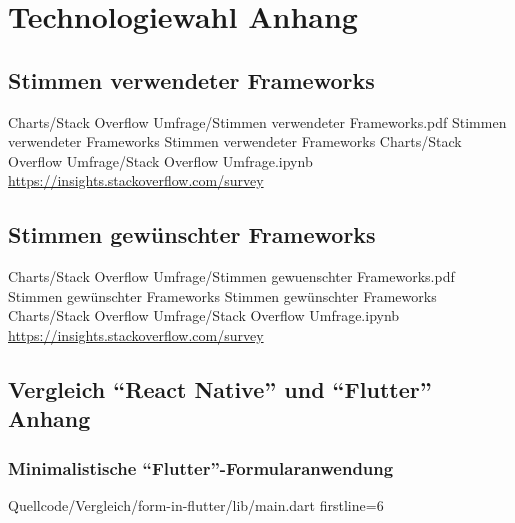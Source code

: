 \chapter{Technologiewahl Anhang} 

\section{Stimmen verwendeter Frameworks} 

\begin{alexfigurewithnotebook}{Charts/Stack Overflow Umfrage/Stimmen verwendeter Frameworks.pdf}
	{Stimmen verwendeter Frameworks}
	{Stimmen verwendeter Frameworks}
	{Charts/Stack Overflow Umfrage/Stack Overflow Umfrage.ipynb}
	{\url{https://insights.stackoverflow.com/survey}}
	\label{fig:StimmenVerwendeterFrameworks}
\end{alexfigurewithnotebook}

\section{Stimmen gewünschter Frameworks} 


\begin{alexfigurewithnotebook}{Charts/Stack Overflow Umfrage/Stimmen gewuenschter Frameworks.pdf}
	{Stimmen gewünschter Frameworks}
	{Stimmen gewünschter Frameworks}
	{Charts/Stack Overflow Umfrage/Stack Overflow Umfrage.ipynb}
	{\url{https://insights.stackoverflow.com/survey}}
	\label{fig:StimmenGewuenschterFrameworks}
\end{alexfigurewithnotebook}


\section{Vergleich \enquote{React Native} und \enquote{Flutter} Anhang} 
\renewcommand{\fcolorbox}[4][]{#4}

\clearpage
\subsection{Minimalistische \enquote{Flutter}-Formularanwendung}
\label{sec:VergleichFlutter}

\begin{alexlisting}{}{}
  {Quellcode/Vergleich/form-in-flutter/lib/main.dart}
  {firstline=6}
  \label{lst:VergleichFlutterMain}
\end{alexlisting}

